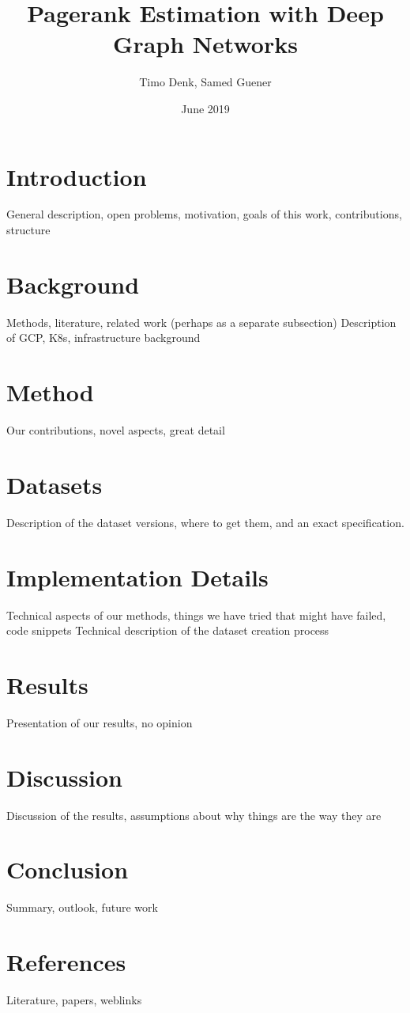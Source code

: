 \documentclass{article}
\title{Pagerank Estimation with Deep Graph Networks}
\author{Timo Denk, Samed Guener}
\date{June 2019}
\begin{document}
\maketitle

\section{Introduction}
General description, open problems, motivation, goals of this work, contributions, structure

\section{Background}
Methods, literature, related work (perhaps as a separate subsection)
Description of GCP, K8s, infrastructure background

\section{Method}
Our contributions, novel aspects, great detail

\section{Datasets}
Description of the dataset versions, where to get them, and an exact specification.

\section{Implementation Details}
Technical aspects of our methods, things we have tried that might have failed, code snippets
Technical description of the dataset creation process


\section{Results}
Presentation of our results, no opinion

\section{Discussion}
Discussion of the results, assumptions about why things are the way they are

\section{Conclusion}
Summary, outlook, future work

\section{References}
Literature, papers, weblinks
\printbibliography
\end{document}
